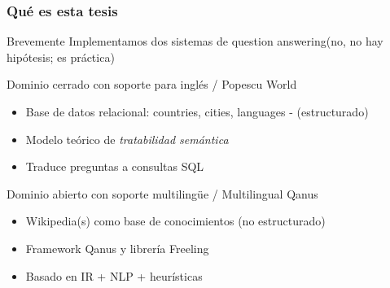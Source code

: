 \begin{frame}[<+->]\fontsize{11pt}{11}\selectfont
  \frametitle{Qué es esta tesis}
    \begin{block}{Brevemente}
      Implementamos dos sistemas de question answering\newline(no, no hay hipótesis; es práctica)
    \end{block}
    \begin{exampleblock}{Dominio cerrado con soporte para inglés / Popescu World}
      \begin{itemize}
          \item Base de datos relacional: countries, cities, languages - (estructurado)
          \item Modelo teórico de \textit{tratabilidad semántica}
          \item Traduce preguntas a consultas SQL
      \end{itemize}
    \end{exampleblock}
    \begin{alertblock}{Dominio abierto con soporte multilingüe / Multilingual Qanus}
      \begin{itemize}
          \item Wikipedia(s) como base de conocimientos (no estructurado)
          \item Framework Qanus y librería Freeling
          \item Basado en IR + NLP + heurísticas
      \end{itemize}
    \end{alertblock}
\end{frame}